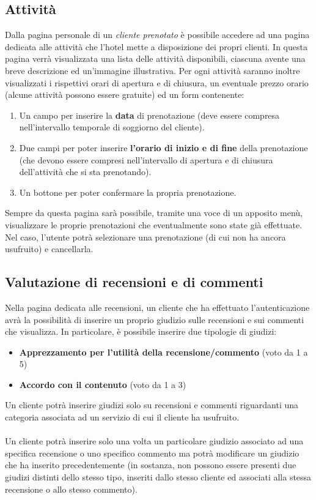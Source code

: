 \documentclass [a4paper, 12pt]{book}
\begin{document}
\subsection{Attività}
\label{Attività}
Dalla pagina personale di un \textit{cliente prenotato} è possibile accedere ad una pagina dedicata alle attività che l'hotel mette a disposizione dei propri clienti. In questa pagina verrà visualizzata una lista delle attività disponibili, ciascuna avente una breve descrizione ed un'immagine illustrativa. Per ogni attività saranno inoltre visualizzati i rispettivi orari di apertura e di chiusura, un eventuale prezzo orario (alcune attività possono essere gratuite) ed un form contenente:
\begin{enumerate}
\item Un campo per inserire la \textbf{data} di prenotazione (deve essere compresa nell'intervallo temporale di soggiorno del cliente).
\item Due campi per poter inserire \textbf{l'orario di inizio e di fine} della prenotazione (che devono essere compresi nell'intervallo di apertura e di chiusura dell'attività che si sta prenotando).
\item Un bottone per poter confermare la propria prenotazione.
\end{enumerate}
Sempre da questa pagina sarà possibile, tramite una voce di un apposito menù,  visualizzare le proprie prenotazioni che eventualmente sono state già effettuate. Nel caso, l'utente potrà selezionare una prenotazione (di cui non ha ancora usufruito) e cancellarla.

\newpage

\subsection{Valutazione di recensioni e di commenti}
Nella pagina dedicata alle recensioni, un cliente che ha effettuato l'autenticazione avrà la possibilità di inserire un proprio giudizio sulle recensioni e sui commenti che visualizza. In particolare, è possibile inserire due tipologie di giudizi:
\begin{itemize}
\item \textbf{Apprezzamento per l'utilità della recensione/commento} (voto da 1 a 5)
\item \textbf{Accordo con il contenuto} (voto da 1 a 3)
\end{itemize}
Un cliente potrà inserire giudizi solo su recensioni e commenti riguardanti una categoria associata ad un servizio di cui il cliente ha usufruito.\\\\
Un cliente potrà inserire solo una volta un particolare giudizio associato ad una specifica recensione o uno specifico commento ma potrà modificare un giudizio che ha inserito precedentemente (in sostanza, non possono essere presenti due giudizi distinti dello stesso tipo, inseriti dallo stesso cliente ed associati alla stessa recensione o allo stesso commento).
\end{document}
